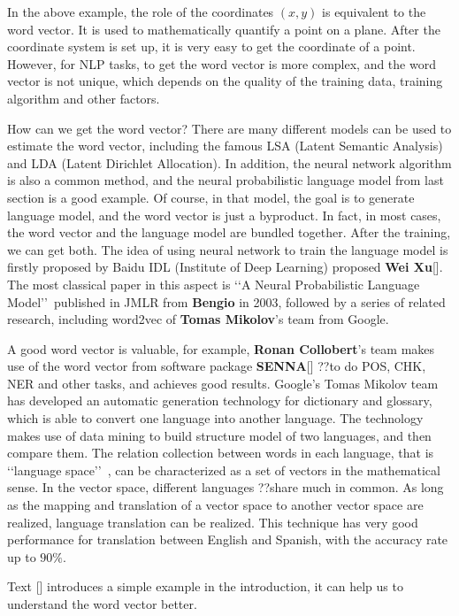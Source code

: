 In the above example, the role of the coordinates $(x, y)$ is equivalent to the word vector. It is used to mathematically quantify a point on a plane. After the coordinate system is set up, it is very easy to get the coordinate of a point. However, for NLP tasks, to get the word vector is more complex, and the word vector is not unique, which depends on the quality of the training data, training algorithm and other factors.

How can we get the word vector? There are many different models can be used to estimate the word vector, including the famous LSA (Latent Semantic Analysis) and LDA (Latent Dirichlet Allocation). In addition, the neural network algorithm is also a common method, and the neural probabilistic language model from last section is a good example. Of course, in that model, the goal is to generate language model, and the word vector is just a byproduct. In fact, in most cases, the word vector and the language model are bundled together. After the training, we can get both. The idea of using neural network to train the language model is firstly proposed by Baidu IDL (Institute of Deep Learning) proposed \textbf{Wei Xu}[]. The most classical paper in this aspect is \lq\lq A Neural Probabilistic Language Model\rq\rq\ published in JMLR from \textbf{Bengio} in 2003, followed by a series of related research, including word2vec of \textbf{Tomas Mikolov}'s team from Google.

A good word vector is valuable, for example, \textbf{Ronan Collobert}'s team makes use of the word vector from software package \textbf{SENNA}[] ??to do POS, CHK, NER and other tasks, and achieves good results. Google's Tomas Mikolov team has developed an automatic generation technology for dictionary and glossary, which is able to convert one language into another language. The technology makes use of data mining to build structure model of two languages, and then compare them. The relation collection between words in each language, that is \lq\lq language space\rq\rq\ , can be characterized as a set of vectors in the mathematical sense. In the vector space, different languages ??share much in common. As long as the mapping and translation of a vector space to another vector space are realized, language translation can be realized. This technique has very good performance for translation between English and Spanish, with the accuracy rate up to $90\%$. 

Text [] introduces a simple example in the introduction, it can help us to understand the word vector better.


